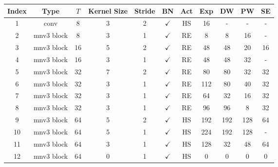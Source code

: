 \begin{table*}[t]
\centering
\begin{tabular}{c|c|c|c|c|c|c|c|c|c|c}
\toprule
Index & Type            & $T$    & Kernel Size & Stride & BN      & Act & Exp  & DW   & PW   & SE  \\ \toprule
1     & conv            & 8    & 3                                                     & 2      & $\checkmark$ & HS  & 16   & -    & -    & -   \\ \hline
2     & mnv3 block      & 8    & 3                                                     & 1      & $\checkmark$ & RE  & 8    & 8    & 16   & -   \\ \hline
3     & mnv3 block      & 16   & 5                                                     & 2      & $\checkmark$ & RE  & 48   & 48   & 20   & 16  \\ \hline
4     & mnv3 block      & 16   & 3                                                     & 1      & $\checkmark$ & RE  & 48   & 48   & 32   & -   \\ \hline
5     & mnv3 block      & 32   & 7                                                     & 2      & $\checkmark$ & RE  & 80   & 80   & 32   & 32  \\ \hline
6     & mnv3 block      & 32   & 3                                                     & 1      & $\checkmark$ & RE  & 112  & 80   & 40   & 32  \\ \hline
7     & mnv3 block      & 32   & 3                                                     & 1      & $\checkmark$ & RE  & 64   & 32   & 16   & 32  \\ \hline
8     & mnv3 block      & 32   & 3                                                     & 1      & $\checkmark$ & RE  & 96   & 96   & 8    & 32  \\ \hline
9     & mnv3 block      & 64   & 5                                                     & 2      & $\checkmark$ & HS  & 192  & 192  & 128  & 64  \\ \hline
10    & mnv3 block      & 64   & 5                                                     & 1      & $\checkmark$ & HS  & 224  & 192  & 128  & -   \\ \hline
11    & mnv3 block      & 64   & 3                                                     & 1      & $\checkmark$ & HS  & 128  & 32   & 48   & 64  \\ \hline
12    & mnv3 block      & 64   & 0                                                     & 1      & $\checkmark$ & HS  & 0    & 0    & 0    & 0   \\ \hline

\end{tabular}
\end{table*}
